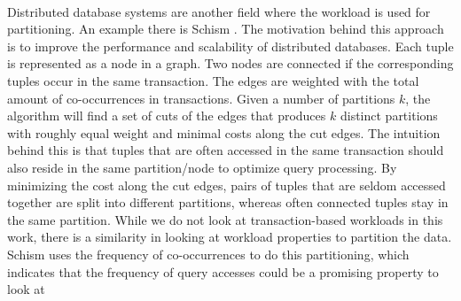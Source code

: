 \paragraph{}
Distributed database systems are another field where the workload is used for partitioning. An example there is Schism \cite{Curino2010}. The motivation behind this approach is to improve the performance and scalability of distributed databases. Each tuple is represented as a node in a graph. Two nodes are connected if the corresponding tuples occur in the same transaction. The edges are weighted with the total amount of co-occurrences in transactions. Given a number of partitions $k$, the algorithm will ﬁnd a set of cuts of the edges that produces $k$ distinct partitions with roughly equal weight and minimal costs along the cut edges. The intuition behind this is that tuples that are often accessed in the same transaction should also reside in the same partition/node to optimize query processing. By minimizing the cost along the cut edges, pairs of tuples that are seldom accessed together are split into diﬀerent partitions, whereas often connected tuples stay in the same partition. While we do not look at transaction-based workloads in this work, there is a similarity in looking at workload properties to partition the data. Schism uses the frequency of co-occurrences to do this partitioning, which indicates that the frequency of query accesses could be a promising property to look at
